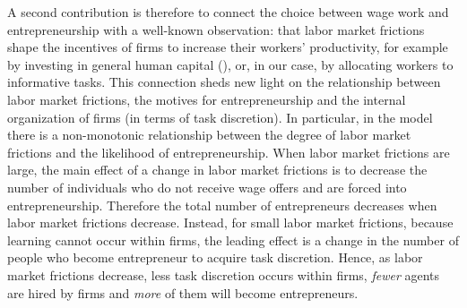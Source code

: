 \documentclass[12pt,american]{paper}
\theoremstyle{remark}
\begin{document}
A second contribution is therefore to connect the choice between wage work and entrepreneurship with a well-known observation: that labor market frictions shape the incentives of firms to increase their workers' productivity, for example by investing in general human capital  (\citealp{acemoglu1999structure}), or, in our case, by allocating workers to informative tasks. This connection sheds new light on the relationship between labor market frictions, the motives for entrepreneurship and the internal organization of firms (in terms of task discretion). In particular, in the model there is a non-monotonic relationship between the degree of labor market frictions and the likelihood of entrepreneurship. When labor market frictions are large, the main effect of a change in labor market frictions is to decrease the number of individuals who do not receive wage offers and are forced into entrepreneurship. Therefore the total number of entrepreneurs decreases when labor market frictions decrease. Instead, for small labor market frictions, because learning cannot occur within firms, the leading effect is a change in the number of people who become entrepreneur to acquire task discretion. Hence, as labor market frictions decrease, less task discretion occurs within firms, \emph{fewer} agents are hired by firms and \textit{more} of them will become entrepreneurs.  
\end{document}
